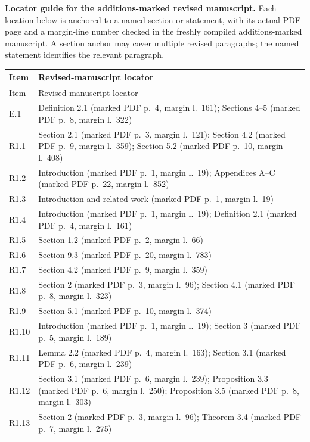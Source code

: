 \documentclass[
  10pt,
  a4paper,
]{article}
\begin{document}
\medskip
\noindent\textbf{Locator guide for the additions-marked revised manuscript.}
Each location below is anchored to a named section or statement, with its
actual PDF page and a margin-line number checked in the freshly compiled
additions-marked manuscript. A section anchor may cover multiple revised
paragraphs; the named statement identifies the relevant paragraph.
\begingroup
\small
\setlength{\LTpre}{4pt}
\setlength{\LTpost}{6pt}
\begin{longtable}{@{}p{}p{}@{}}
\toprule
Item & Revised-manuscript locator \\
\midrule
\endfirsthead
\toprule
Item & Revised-manuscript locator \\
\midrule
\endhead
E.1 & Definition 2.1 (marked PDF p.~4, margin l.~161); Sections 4--5 (marked PDF p.~8, margin l.~322)\\
R1.1 & Section 2.1 (marked PDF p.~3, margin l.~121); Section 4.2 (marked PDF p.~9, margin l.~359); Section 5.2 (marked PDF p.~10, margin l.~408)\\
R1.2 & Introduction (marked PDF p.~1, margin l.~19); Appendices A--C (marked PDF p.~22, margin l.~852)\\
R1.3 & Introduction and related work (marked PDF p.~1, margin l.~19)\\
R1.4 & Introduction (marked PDF p.~1, margin l.~19); Definition 2.1 (marked PDF p.~4, margin l.~161)\\
R1.5 & Section 1.2 (marked PDF p.~2, margin l.~66)\\
R1.6 & Section 9.3 (marked PDF p.~20, margin l.~783)\\
R1.7 & Section 4.2 (marked PDF p.~9, margin l.~359)\\
R1.8 & Section 2 (marked PDF p.~3, margin l.~96); Section 4.1 (marked PDF p.~8, margin l.~323)\\
R1.9 & Section 5.1 (marked PDF p.~10, margin l.~374)\\
R1.10 & Introduction (marked PDF p.~1, margin l.~19); Section 3 (marked PDF p.~5, margin l.~189)\\
R1.11 & Lemma 2.2 (marked PDF p.~4, margin l.~163); Section 3.1 (marked PDF p.~6, margin l.~239)\\
R1.12 & Section 3.1 (marked PDF p.~6, margin l.~239); Proposition 3.3 (marked PDF p.~6, margin l.~250); Proposition 3.5 (marked PDF p.~8, margin l.~303)\\
R1.13 & Section 2 (marked PDF p.~3, margin l.~96); Theorem 3.4 (marked PDF p.~7, margin l.~275)\\

\end{longtable}
\end{document}

